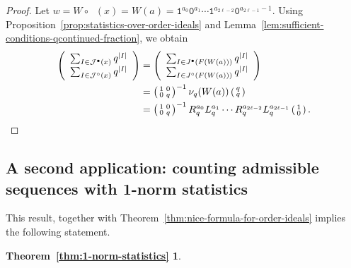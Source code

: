 \documentclass[a4paper,12pt]{amsart}
\newtheorem*{THEOREMB}{Theorem~\ref{thm:1-norm-statistics}}
\newcommand{\xx}{{x}}
\newcommand{\Jcal}{{\mathcal{J}}}
\newcommand{\0}{\mathtt{0}}
\newcommand{\1}{\mathtt{1}}
\newcommand{\2}{\mathtt{2}}
\newcommand{\3}{\mathtt{3}}
\DeclareMathOperator{\CFeven}{{CF_{\text{even}}}}
\newcommand{\size}[1]{
    {|#1|}                 %
}
\begin{document}
\begin{proof}
    Let $w=W\circ\CFeven(\xx)=W(a)
           =\1^{a_0}\0^{a_{1}}\cdots \1^{a_{2\ell-2}}\0^{a_{2\ell-1}-1}$.
    Using Proposition~\ref{prop:statistics-over-order-ideals}
    and Lemma~\ref{lem:sufficient-conditions-qcontinued-fraction},
    we obtain
    \begin{align*}
    \left(\begin{array}{r}
            \sum_{I\in \Jcal^\bullet(\xx)} q^{\size{I}}\\
            \sum_{I\in \Jcal^\circ  (\xx)} q^{\size{I}}
    \end{array}\right)
        &=
    \left(\begin{array}{r}
            \sum_{I\in J^\bullet(F(W(a)))} q^{\size{I}}\\
            \sum_{I\in J^\circ  (F(W(a)))} q^{\size{I}}
    \end{array}\right)\\
        &= \left(\begin{smallmatrix} 1 & 0 \\ 0 & q \end{smallmatrix}\right)^{-1}
                \nu_q(W(a))
            \left(\begin{smallmatrix} q \\ q \end{smallmatrix}\right)\\
        &=
        \left(\begin{smallmatrix} 1 & 0 \\ 0 & q \end{smallmatrix}\right)^{-1}
        R_q^{a_0}L_q^{a_1}\cdots R_q^{a_{2\ell-2}}L_q^{a_{2\ell-1}}
        \left(\begin{smallmatrix} 1 \\ 0 \end{smallmatrix}\right).
    \end{align*}
\end{proof}

\subsection{A second application: counting admissible sequences with 1-norm statistics}

This result, together with Theorem~\ref{thm:nice-formula-for-order-ideals}
implies the following statement.

\begin{THEOREMB}
    \MainTheoremB
\end{THEOREMB}
\end{document}
